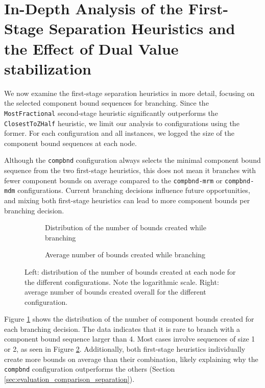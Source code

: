 \section{In-Depth Analysis of the First-Stage Separation Heuristics and the Effect of Dual Value stabilization}\label{sec:evaluation_comparison_separation_firststage}
We now examine the first-stage separation heuristics in more detail, focusing on the selected component bound sequences for branching. Since the \texttt{MostFractional} second-stage heuristic significantly outperforms the \texttt{ClosestToZHalf} heuristic, we limit our analysis to configurations using the former. For each configuration and all instances, we logged the size of the component bound sequences at each node.

Although the \texttt{compbnd} configuration always selects the minimal component bound sequence from the two first-stage heuristics, this does not mean it branches with fewer component bounds on average compared to the \texttt{compbnd-mrm} or \texttt{compbnd-mdm} configurations. Current branching decisions influence future opportunities, and mixing both first-stage heuristics can lead to more component bounds per branching decision.

\begin{figure}
	\centering

	\begin{subfigure}{0.495\textwidth}
		\centering
		
		\caption{Distribution of the number of bounds created while branching}
		\label{fig:compbnd_num_bounds}
	\end{subfigure}
	\hfill
	\begin{subfigure}{0.495\textwidth}
		\centering
		
		\caption{Average number of bounds created while branching}
		\label{fig:compbnd_avg_num_bounds}
	\end{subfigure}

	\caption{Left: distribution of the number of bounds created at each node for the different configurations. Note the logarithmic scale. Right: average number of bounds created overall for the different configuration.}
	\label{fig:comparison_bounds}
\end{figure}

Figure \ref{fig:compbnd_num_bounds} shows the distribution of the number of component bounds created for each branching decision. The data indicates that it is rare to branch with a component bound sequence larger than 4. Most cases involve sequences of size 1 or 2, as seen in Figure \ref{fig:compbnd_avg_num_bounds}. Additionally, both first-stage heuristics individually create more bounds on average than their combination, likely explaining why the \texttt{compbnd} configuration outperforms the others (Section \ref{sec:evaluation_comparison_separation}).


